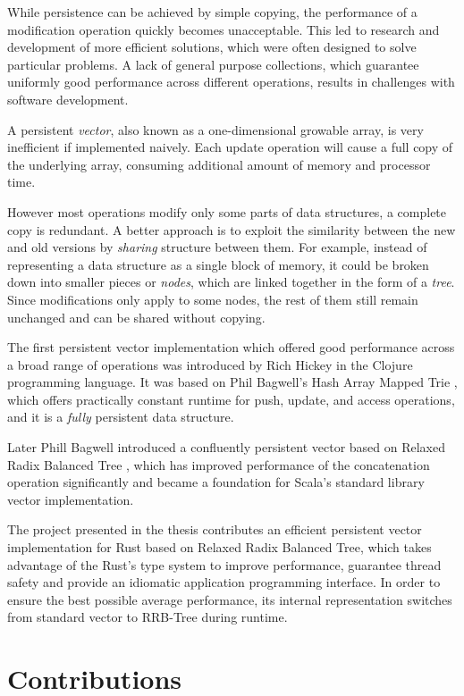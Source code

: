 While persistence can be achieved by simple copying, the performance of a modification operation quickly becomes unacceptable. This led to research and development of more efficient solutions, which were often designed to solve particular problems. A lack of general purpose collections, which guarantee uniformly good performance across different operations, results in challenges with software development.

A persistent \emph{vector}, also known as a one-dimensional growable array, is very inefficient if implemented naively. Each update operation will cause a full copy of the underlying array, consuming additional amount of memory and processor time.

However most operations modify only some parts of data structures, a complete copy is redundant. A better approach is to exploit the similarity between the new and old versions by \emph{sharing} structure between them. For example, instead of representing a data structure as a single block of memory, it could be broken down into smaller pieces or \emph{nodes}, which are linked together in the form of a \emph{tree}. Since modifications only apply to some nodes, the rest of them still remain unchanged and can be shared without copying.

The first persistent vector implementation which offered good performance across a broad range of operations was introduced by Rich Hickey in the Clojure programming language. It was based on Phil Bagwell's Hash Array Mapped Trie \cite{ideal-hash-trees}, which offers practically constant runtime for push, update, and access operations, and it is a \emph{fully} persistent data structure.

Later Phill Bagwell introduced a confluently persistent vector based on Relaxed Radix Balanced Tree \cite{efficient-immutable-vectors}, which has improved performance of the concatenation operation significantly and became a foundation for Scala's standard library vector implementation.

The project presented in the thesis contributes an efficient persistent vector implementation for Rust based on Relaxed Radix Balanced Tree, which takes advantage of the Rust's type system to improve performance, guarantee thread safety and provide an idiomatic application programming interface. In order to ensure the best possible average performance, its internal representation switches from standard vector to RRB-Tree during runtime.

\section{Contributions}
\label{sec:contributions}

